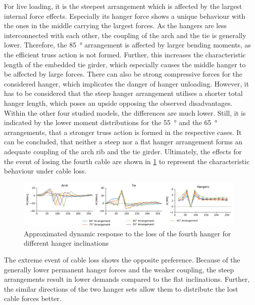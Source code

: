 For live loading, it is the steepest arrangement which is affected by the largest internal force effects. Especially its hanger force shows a unique behaviour with the ones in the middle carrying the largest forces. As the hangers are less interconnected with each other, the coupling of the arch and the tie is generally lower. Therefore, the \SI{85}{\degree} arrangement is affected by larger bending moments, as the efficient truss action is not formed. Further, this increases the characteristic length of the embedded tie girder, which especially causes the middle hanger to be affected by large forces. There can also be strong compressive forces for the considered hanger, which implicates the danger of hanger unloading. However, it has to be considered that the steep hanger arrangement utilises a shorter total hanger length, which poses an upside opposing the observed disadvantages. Within the other four studied models, the differences are much lower. Still, it is indicated by the lower moment distributions for the \SI{55}{\degree} and the \SI{65}{\degree} arrangements, that a stronger truss action is formed in the respective cases. It can be concluded, that neither a steep nor a flat hanger arrangement forms an adequate coupling of the arch rib and the tie girder. 
Ultimately, the effects for the event of losing the fourth cable are shown in \cref{fig:inclination_cable} to represent the characteristic behaviour under cable loss.

\begin{figure}[H]
    \centering
    \includegraphics[trim={1cm 0 1cm 0},clip, width=\textwidth]{calculations/parallel arrangement comparison/cable loss 4_plot.png}
    \caption{Approximated dynamic response to the loss of the fourth hanger for different hanger inclinations}
    \label{fig:inclination_cable}
\end{figure}

The extreme event of cable loss shows the opposite preference. Because of the generally lower permanent hanger forces and the weaker coupling, the steep arrangements result in lower demands compared to the flat inclinations. Further, the similar directions of the two hanger sets allow them to distribute the lost cable forces better. 

